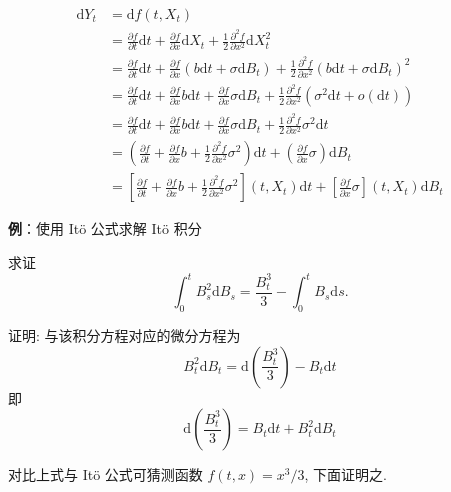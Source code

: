 \documentclass[openany]{ctexbook}
\theoremstyle{kaiti}
\theoremstyle{normal}
\begin{document}
\begin{equation}
  \begin{aligned}
    \mathrm{d}Y_t&=\mathrm{d}f(t,X_t)\\
    &=\frac{\partial f}{\partial t}\mathrm{d}t+\frac{\partial f}{\partial x}\mathrm{d}X_t+\frac{1}{2}\frac{\partial^2 f}{\partial x^2}\mathrm{d}X_t^2\\
    &=\frac{\partial f}{\partial t}\mathrm{d}t+\frac{\partial f}{\partial x}(b\mathrm{d}t+\sigma\mathrm{d}B_t)+\frac{1}{2}\frac{\partial^2 f}{\partial x^2}(b\mathrm{d}t+\sigma\mathrm{d}B_t)^2\\
    &=\frac{\partial f}{\partial t}\mathrm{d}t+\frac{\partial f}{\partial x}b\mathrm{d}t+\frac{\partial f}{\partial x}\sigma\mathrm{d}B_t+\frac{1}{2}\frac{\partial^2 f}{\partial x^2}(\sigma^2\mathrm{d}t+o(\mathrm{d}t))\\
    &=\frac{\partial f}{\partial t}\mathrm{d}t+\frac{\partial f}{\partial x}b\mathrm{d}t+\frac{\partial f}{\partial x}\sigma\mathrm{d}B_t+\frac{1}{2}\frac{\partial^2 f}{\partial x^2}\sigma^2\mathrm{d}t\\
    &=\left(\frac{\partial f}{\partial t}+\frac{\partial f}{\partial x}b+\frac{1}{2}\frac{\partial^2 f}{\partial x^2}\sigma^2\right)\mathrm{d}t+\left(\frac{\partial f}{\partial x}\sigma\right)\mathrm{d}B_t\\
    &=\left[\frac{\partial f}{\partial t}+\frac{\partial f}{\partial x}b+\frac{1}{2}\frac{\partial^2 f}{\partial x^2}\sigma^2\right](t,X_t)\mathrm{d}t+\left[\frac{\partial f}{\partial x}\sigma\right](t,X_t)\mathrm{d}B_t
  \end{aligned}
\end{equation}

\textbf{例}：使用 It\"o 公式求解 It\"o 积分

求证
\begin{equation}
  \int_0^tB_s^2\mathrm{d}B_s=\frac{B_t^3}{3}-\int_0^tB_s\mathrm{d}s.
\end{equation}

证明: 与该积分方程对应的微分方程为
\begin{equation}
  B_t^2\mathrm{d}B_t=\mathrm{d}\left(\frac{B_t^3}{3}\right)-B_t\mathrm{d}t
\end{equation}
即
\begin{equation}
  \mathrm{d}\left(\frac{B_t^3}{3}\right)=B_t\mathrm{d}t+B_t^2\mathrm{d}B_t
\end{equation}

对比上式与 It\"o 公式可猜测函数 $f(t,x)=x^3/3$, 下面证明之.
\end{document}
